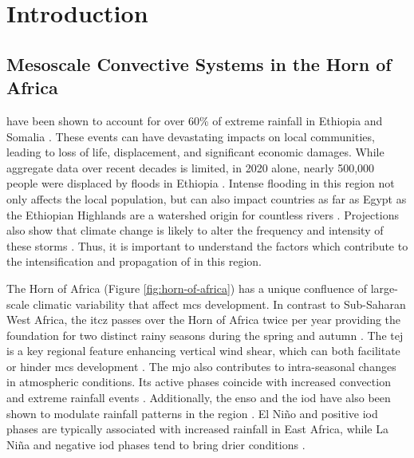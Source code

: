 \chapter{Introduction}
\label{ch:intro}

\section{Mesoscale Convective Systems in the Horn of Africa}

 have been shown to account for over 60\% of extreme rainfall in Ethiopia and Somalia \citep{Hill2023}. These events can have devastating impacts on local communities, leading to loss of life, displacement, and significant economic damages. While aggregate data over recent decades is limited, in 2020 alone, nearly 500,000 people were displaced by floods in Ethiopia \citep{Mekuria2022}. Intense flooding in this region not only affects the local population, but can also impact countries as far as Egypt as the Ethiopian Highlands are a watershed origin for countless rivers \citep{Mamo2019,Legese2020,Zaroug2014}. Projections also show that climate change is likely to alter the frequency and intensity of these storms \citep{Endris2019,Das2016,Li2023}. Thus, it is important to understand the factors which contribute to the intensification and propagation of  in this region.

The Horn of Africa (Figure \ref{fig:horn-of-africa}) has a unique confluence of large-scale climatic variability that affect \acrshort{mcs} development. In contrast to Sub-Saharan West Africa, the \acrfull{itcz} passes over the Horn of Africa twice per year providing the foundation for two distinct rainy seasons during the spring and autumn \citep{Palmer2023,Tefera2025}. The \acrfull{tej} is a key regional feature enhancing vertical wind shear, which can both facilitate or hinder \acrshort{mcs} development \citep{Farnsworth2011,Vashisht2021}. The \acrfull{mjo} also contributes to intra-seasonal changes in atmospheric conditions. Its active phases coincide with increased convection and extreme rainfall events \citep{Camberlin2019,Ochieng2023,Pohl2006}. Additionally, the \acrfull{enso} and the \acrfull{iod} have also been shown to modulate rainfall patterns in the region \citep{Dubache2019,Endris2019,Vashisht2021,Zaroug2014}. El Niño and positive \acrshort{iod} phases are typically associated with increased rainfall in East Africa, while La Niña and negative \acrshort{iod} phases tend to bring drier conditions \citep{Camberlin2019,Endris2019}.

